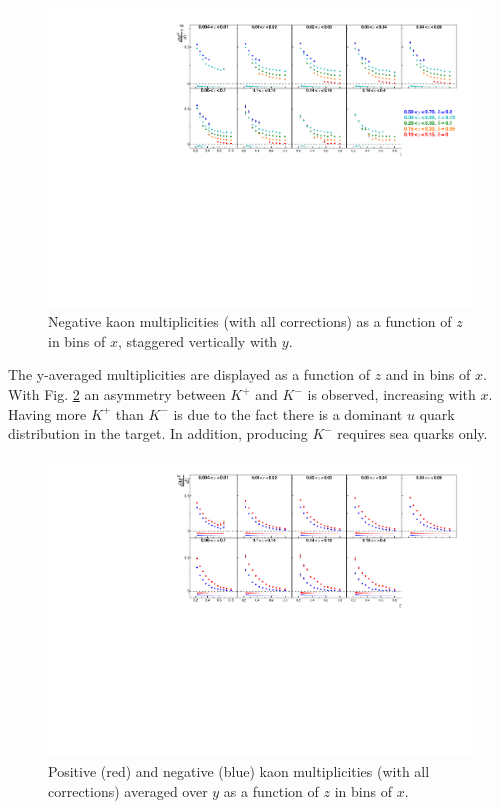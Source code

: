 \begin{figure}[!h]
  \centering
	\includegraphics[scale=0.85]{./gfx/Km.pdf}
	\caption{Negative kaon multiplicities (with all corrections) as a function of $z$ in bins of $x$, staggered vertically with $y$.}
	\label{pic:mkm}
\end{figure}

The y-averaged multiplicities are displayed as a function of $z$ and in bins of $x$. With Fig. \ref{pic:mkyavg} an asymmetry between $K^+$ and $K^-$ is observed, increasing with $x$. Having more $K^+$ than $K^-$ is due to the fact there is a dominant $u$ quark distribution in the target. In addition, producing $K^-$ requires sea quarks only.

\begin{figure}[!h]
  \centering
	\includegraphics[scale=0.85]{./gfx/Kyavg.pdf}
	\caption{Positive (red) and negative (blue) kaon multiplicities (with all corrections) averaged over $y$ as a function of $z$ in bins of $x$.}
	\label{pic:mkyavg}
\end{figure}

